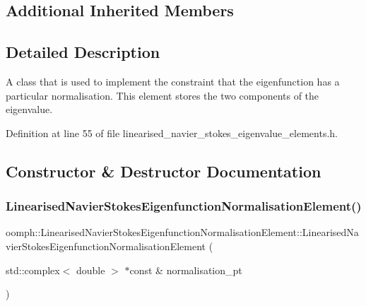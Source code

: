 \subsection*{Additional Inherited Members}


\subsection{Detailed Description}
A class that is used to implement the constraint that the eigenfunction has a particular normalisation. This element stores the two components of the eigenvalue. 

Definition at line 55 of file linearised\+\_\+navier\+\_\+stokes\+\_\+eigenvalue\+\_\+elements.\+h.



\subsection{Constructor \& Destructor Documentation}
\mbox{\label{classoomph_1_1LinearisedNavierStokesEigenfunctionNormalisationElement_a38ea9510f1bb602fa2d633f8dd2506de}} 
\subsubsection{\texorpdfstring{Linearised\+Navier\+Stokes\+Eigenfunction\+Normalisation\+Element()}{LinearisedNavierStokesEigenfunctionNormalisationElement()}}
{\footnotesize\ttfamily oomph\+::\+Linearised\+Navier\+Stokes\+Eigenfunction\+Normalisation\+Element\+::\+Linearised\+Navier\+Stokes\+Eigenfunction\+Normalisation\+Element (\begin{DoxyParamCaption}\item[{std\+::complex$<$ double $>$ $\ast$const \&}]{normalisation\+\_\+pt }\end{DoxyParamCaption})}



